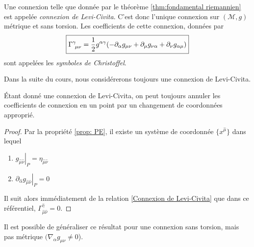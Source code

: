 \begin{theoremframe}
    \begin{defi}
        Une connexion telle que donnée par le théorème \ref{thm:fondamental riemannien} est appelée \emph{connexion de Levi-Civita}. C'est donc l'unique connexion sur $(\mathcal{M},g)$ métrique et sans torsion. Les coefficients de cette connexion, données par
        \begin{equation}
            \boxed{\Gamma\indices{^{\gamma}_{\!\mu \nu}} = \frac{1}{2}g^{\alpha \gamma}( - \partial_{\alpha}g_{\mu \nu} + \partial_{\mu}g_{\nu \alpha} + \partial_{\nu}g_{\alpha \mu})}
    \label{Connexion de Levi-Civita}
        \end{equation}
        sont appelées les \emph{symboles de Christoffel}.
    \end{defi}
\end{theoremframe}
Dans la suite du cours, nous considérerons toujours une connexion de Levi-Civita.
\begin{theoremframe}
    \begin{propri}
        Étant donné une connexion de Levi-Civita, on peut toujours annuler les coefficients de connexion en un point par un changement de coordonnées approprié. 
    \end{propri}
\end{theoremframe}
\begin{proof}
   Par la propriété \ref{prop: PE}, il existe un système de coordonnée $\{x^{\hat{\mu}}\}$ dans lequel 
    \begin{enumerate}
        \item $\left. g_{\hat{\mu}\hat{\nu}} \right|_P = \eta_{\hat{\mu}\hat{\nu}}$
        \item $ \left. \partial_{\hat{\alpha}}g_{\hat{\mu}\hat{\nu}} \right|_P=0$
    \end{enumerate}
    Il suit alors immédiatement de la relation \ref{Connexion de Levi-Civita} que dans ce référentiel, $ \Gamma^{\hat{\gamma}}_{\!\hat{\mu} \hat{\nu}} =0$. 
\end{proof}
Il est possible de généraliser ce résultat pour une connexion sans torsion, mais pas métrique $( \nabla_{\alpha}g_{\mu \nu} \neq 0$).
